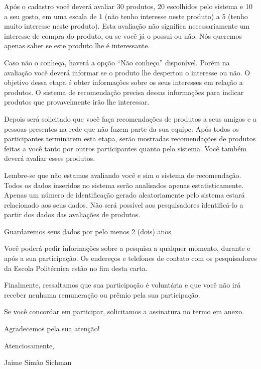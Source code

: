  Após o cadastro você deverá avaliar 30 produtos, 20 escolhidos pelo sistema e 10 a seu gosto, em uma escala de 1 (não tenho interesse neste produto) a 5 (tenho muito interesse neste produto). Esta avaliação não significa necessariamente um interesse de compra do produto, ou se você já o possui ou não. Nós queremos apenas saber se este produto lhe é interessante.

 Caso não o conheça, haverá a opção ``Não conheço'' disponível. Porém na avaliação você deverá informar se o produto lhe despertou o interesse ou não. O objetivo dessa etapa é obter informações sobre os seus interesses em relação a produtos. O sistema de recomendação precisa dessas informações para indicar produtos que provavelmente irão lhe interessar.

 Depois será solicitado que você faça recomendações de produtos a seus amigos e a pessoas presentes na rede que não fazem parte da sua equipe. Após todos os participantes terminarem esta etapa, serão mostradas recomendações de produtos feitas a você tanto por outros participantes quanto pelo sistema. Você também deverá avaliar esses produtos.

Lembre-se que não estamos avaliando você e sim o sistema de recomendação.  Todos os dados inseridos no sistema serão analisados apenas estatisticamente. Apenas um número de identificação gerado aleatoriamente pelo sistema estará relacionado aos seus dados. Não será possível aos pesquisadores identificá-lo a partir dos dados das avaliações de produtos.

	Guardaremos seus dados por pelo menos 2 (dois) anos.

	Você poderá pedir informações sobre a pesquisa a qualquer momento, durante e após a sua participação. Os endereços e telefones de contato com os pesquisadores da Escola Politécnica estão no fim desta carta.

	Finalmente, ressaltamos que sua participação é voluntária e que você não irá receber nenhuma remuneração ou prêmio pela sua participação.

Se você concordar em participar, solicitamos a assinatura no termo em anexo.

Agradecemos pela sua atenção!

Atenciosamente,

\vspace{0.2in}

Jaime Simão Sichman

\vspace{0.2in}

